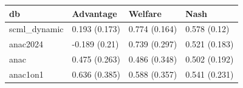 \begin{tabular}{llll}
\toprule
db & Advantage & Welfare & Nash \\
\midrule
scml_dynamic & 0.193 (0.173) & 0.774 (0.164) & 0.578 (0.12) \\
anac2024 & -0.189 (0.21) & 0.739 (0.297) & 0.521 (0.183) \\
anac & 0.475 (0.263) & 0.486 (0.348) & 0.502 (0.192) \\
anac1on1 & 0.636 (0.385) & 0.588 (0.357) & 0.541 (0.231) \\
\bottomrule
\end{tabular}
